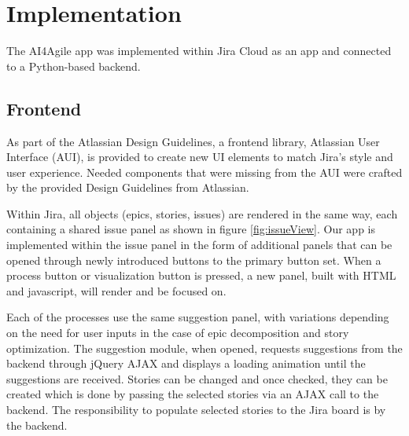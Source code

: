 \section{Implementation}

The AI4Agile app was implemented within Jira Cloud as an app and connected to a Python-based backend.

\subsection{Frontend}

As part of the Atlassian Design Guidelines, a frontend library, Atlassian User Interface (AUI), is provided to create new UI elements to match Jira’s style and user experience. Needed components that were missing from the AUI were crafted by the provided Design Guidelines from Atlassian.

Within Jira, all objects (epics, stories, issues) are rendered in the same way, each containing a shared issue panel as shown in figure \ref{fig:issueView}. Our app is implemented within the issue panel in the form of additional panels that can be opened through newly introduced buttons to the primary button set. When a process button or visualization button is pressed, a new panel, built with HTML and javascript, will render and be focused on.

Each of the processes use the same suggestion panel, with variations depending on the need for user inputs in the case of epic decomposition and story optimization. The suggestion module, when opened, requests suggestions from the backend through jQuery AJAX and displays a loading animation until the suggestions are received. Stories can be changed and once checked, they can be created which is done by passing the selected stories via an AJAX call to the backend. The responsibility to populate selected stories to the Jira board is by the backend.

